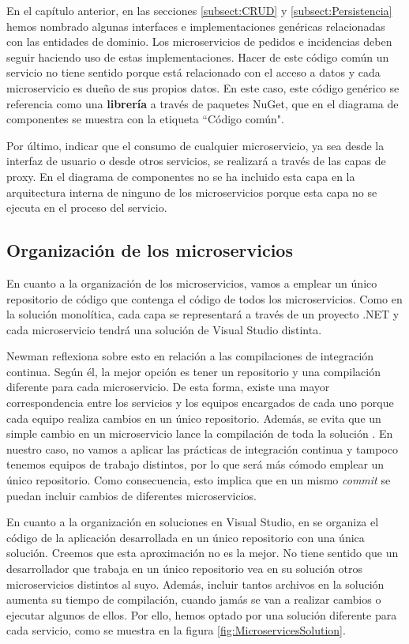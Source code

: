 \documentclass[11pt,spanish,listoffigures]{tfgetsinf}
\begin{document}
En el capítulo anterior, en las secciones \ref{subsect:CRUD}  y \ref{subsect:Persistencia}  hemos nombrado algunas interfaces e implementaciones genéricas relacionadas con las entidades de dominio. Los microservicios de pedidos e incidencias deben seguir haciendo uso de estas implementaciones. Hacer de este código común un servicio no tiene sentido porque está relacionado con el acceso a datos y cada microservicio es dueño de sus propios datos. En este caso, este código genérico se referencia como una \textbf{librería} a través de paquetes NuGet, que en el diagrama de componentes se muestra con la etiqueta ``Código común".

Por último, indicar que el consumo de cualquier microservicio, ya sea desde la interfaz de usuario o desde otros servicios, se realizará a través de las capas de proxy. En el diagrama de componentes no se ha incluido esta capa en la arquitectura interna de ninguno de los microservicios porque esta capa no se ejecuta en el proceso del servicio.

\subsection{Organización de los microservicios}

En cuanto a la organización de los microservicios, vamos a emplear un único repositorio de código que contenga el código de todos los microservicios. Como en la solución monolítica, cada capa se representará a través de un proyecto .NET y cada microservicio tendrá una solución de Visual Studio distinta.

Newman \cite{Newman2015a} reflexiona sobre esto en relación a las compilaciones de integración continua. Según él, la mejor opción es tener un repositorio y una compilación diferente para cada microservicio. De esta forma, existe una mayor correspondencia entre los servicios y los equipos encargados de cada uno porque cada equipo realiza cambios en un único repositorio. Además, se evita que un simple cambio en un microservicio lance la compilación de toda la solución \cite{Newman2015a}. En nuestro caso, no vamos a aplicar las prácticas de integración continua y tampoco tenemos equipos de trabajo distintos, por lo que será más cómodo emplear un único repositorio. Como consecuencia, esto implica que en un mismo \textit{commit} se puedan incluir cambios de diferentes microservicios.

En cuanto a la organización en soluciones en Visual Studio, en \cite{DelaTorre2018} se organiza el código de la aplicación desarrollada en un único repositorio con una única solución. Creemos que esta aproximación no es la mejor. No tiene sentido que un desarrollador que trabaja en un único repositorio vea en su solución otros microservicios distintos al suyo. Además, incluir tantos archivos en la solución aumenta su tiempo de compilación, cuando jamás se van a realizar cambios o ejecutar algunos de ellos. Por ello, hemos optado por una solución diferente para cada servicio, como se muestra en la figura \ref{fig:MicroservicesSolution}.
\end{document}

